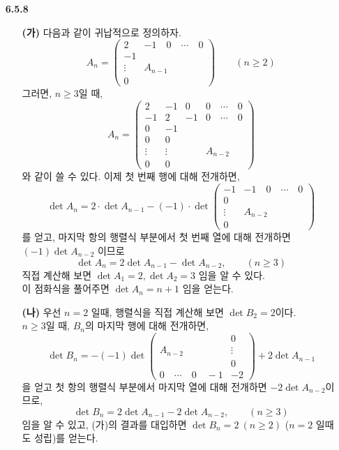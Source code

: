 \documentclass{article}
\begin{document}
\begin{itemize}
\item[\textbf{6.5.8}]
	\begin{itemize}
		\item[\textbf{(가)}] 다음과 같이 귀납적으로 정의하자.
			$$
				A_n = \left(\begin{array}{c|c}
				2 & -1 \quad 0 \quad \cdots \quad 0 \\ \hline
				-1 \\
				\vdots & A_{n-1}
				\\0 
				\end{array}\right) \qquad (n \geq 2)
			$$ 그러면, $n \geq 3$일 때,
			$$
				A_n = \left(\begin{array}{c|c|cc}
				2 & -1 & 0 & 0 \quad \cdots \quad 0 \\ \hline
				-1 & 2 & -1 & 0 \quad \cdots \quad 0 \\ \hline
				0 & -1 \\
				0 & 0 \\			
				\vdots & \vdots & & A_{n-2}\\
				0 & 0
				\end{array}\right)
			$$ 와 같이 쓸 수 있다. 이제 첫 번째 행에 대해 전개하면,
			$$\det{A_n} = 2 \cdot \det A_{n-1} - (-1) \cdot \det \left(
				\begin{array}{c|c}
					-1 & -1 \quad 0 \quad \cdots \quad 0 \\ \hline
					0 \\
					\vdots & A_{n-2} \\
					0
				\end{array}
			\right)$$ 를 얻고, 마지막 항의 행렬식 부분에서 첫 번째 열에 대해 전개하면 $(-1)\det{A_{n-2}}$ 이므로
			$$
				\det{A_n} = 2\det A_{n-1} - \det{A_{n-2}}, \qquad (n\geq 3)		
			$$
			직접 계산해 보면 $\det A_1 = 2, \det A_2 = 3$ 임을 알 수 있다. 
			\\이 점화식을 풀어주면 $\det A_n = n+1$ 임을 얻는다.
			
		\item[\textbf{(나)}] 우선 $n=2$ 일때, 행렬식을 직접 계산해 보면 $\det B_2 = 2$이다. \\ $n \geq 3$일 때, $B_n$의 마지막 행에 대해 전개하면,
			$$
				\det B_n = -(-1) \det \left(
					\begin{array}{c|c}
						& 0 \\
						A_{n-2} & \vdots \\
						& 0 \\ \hline
						0 \quad \cdots \quad 0 \quad -1 & -2
					\end{array}
				\right) + 2\det A_{n-1}
			$$ 을 얻고 첫 항의 행렬식 부분에서 마지막 열에 대해 전개하면 $-2\det A_{n-2}$이므로, 
			$$
				\det B_n = 2\det A_{n-1} - 2\det A_{n-2}, \qquad (n \geq 3)
			$$ 임을 알 수 있고, (가)의 결과를 대입하면 $\det B_n = 2 \: (n\geq 2)$ ($n=2$ 일때도 성립)를 얻는다.
			

\end{itemize}
\end{itemize}
\end{document}
